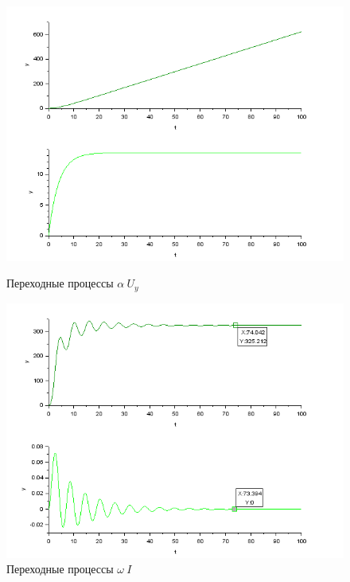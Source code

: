 \documentclass[a4paper,12pt,russian]{article} %
\begin{document}
\begin{figure}[H]
	\includegraphics[width=\linewidth]{411.png}
	\caption{Переходные процессы $\alpha\:  U_y$}\label{p411}
	\endminipage\hfill
	\includegraphics[width=\linewidth]{412.png}
	\caption{Переходные процессы $\omega\:  I$}\label{p412}
	\endminipage
\end{figure}
\end{document}
